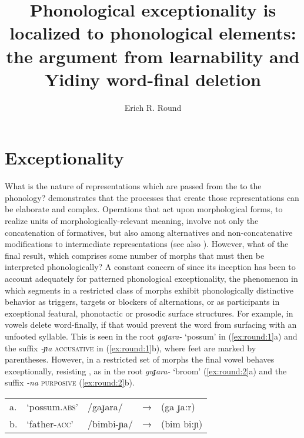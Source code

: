 \documentclass[output=paper,
modfonts
]{LSP/langsci}
\title{Phonological exceptionality is localized to phonological elements: the argument from learnability and Yidiny word-final deletion}
\author{%
Erich R. Round\affiliation{University of Queensland}
}
\begin{document}
\maketitle

\section[Exceptionality]{Exceptionality}\label{sec:round:1}

What is the nature of representations which are passed from the  to the phonology? \citet{anderson1992} demonstrates that the processes that create those representations can be elaborate and complex. Operations that act upon morphological forms, to realize units of morphologically-relevant meaning, involve not only the concatenation of formatives, but also  among alternatives and non-concatenative modifications to intermediate representations (see also \citealt{anderson2015,anderson2016,andersontoappearar}). However, what of the final result, which comprises some number of morphs that must then be interpreted phonologically? A constant concern of  since its inception has been to account adequately for patterned phonological exceptionality, the phenomenon in which segments in a restricted class of morphs exhibit phonologically distinctive behavior as triggers, targets or blockers of alternations, or as participants in exceptional featural, phonotactic or prosodic surface structures. For example, in  \citep{dixon1977a,dixon1977b} vowels delete word-finally, if that  would prevent the word from surfacing with an unfooted syllable. This is seen in the root \textit{gaɟara-} `possum' in (\ref{ex:round:1}a) and the suffix \textit{-ɲa} \textsc{accusative} in (\ref{ex:round:1}b), where feet are marked by parentheses. However, in a restricted set of morphs the final vowel behaves exceptionally, resisting , as in the root \textit{guɟara-} `broom' (\ref{ex:round:2}a) and the suffix \textit{-na} \textsc{purposive} (\ref{ex:round:2}b).

\ea \label{ex:round:1}
\begin{tabular}[t]{@{}lllll}
a. & `possum.\textsc{abs}' & /gaɟara/ & → & (ga ɟa:r) \\
b. & `father-\textsc{acc}' & /bimbi-ɲa/ & → & (bim bi:ɲ) \\
\end{tabular}
\end{document}
